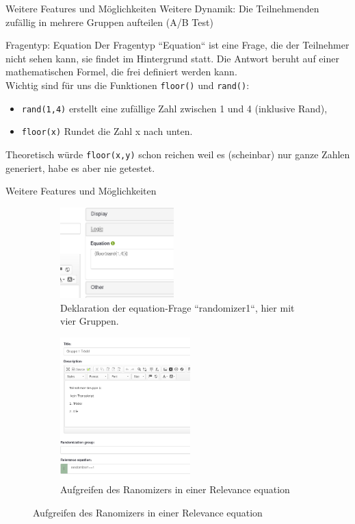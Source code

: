 \documentclass[aspectratio=1610, 9pt]{beamer}
\begin{document}
\begin{frame}
	{Weitere Features und Möglichkeiten}
	Weitere Dynamik: Die Teilnehmenden zufällig in mehrere Gruppen aufteilen
	(\alert{A/B Test})
	\\ \medskip
	\begin{block}{Fragentyp: Equation}
		Der Fragentyp ``Equation`` ist eine Frage, die der \alert{Teilnehmer nicht 
		sehen kann}, sie findet im Hintergrund statt. Die Antwort beruht auf einer
		mathematischen Formel, die frei definiert werden kann.
		\\
		Wichtig sind für uns die Funktionen \texttt{floor()} und \texttt{rand()}:
		\begin{itemize}
			\item \texttt{rand(1,4)} erstellt eine zufällige Zahl zwischen 1
				und 4 (inklusive Rand),
			\item \texttt{floor(x)} Rundet die Zahl x nach unten.
		\end{itemize}
		Theoretisch würde \texttt{floor(x,y)} schon reichen weil es
		(\alert{scheinbar}) nur ganze Zahlen generiert, habe es aber nie getestet.
	\end{block}
\end{frame}

\begin{frame}
	{Weitere Features und Möglichkeiten}
	\begin{figure}
		\centering
		\begin{subfigure}[b]{0.2\textwidth}
			\centering
			\includegraphics[height=3.5cm]{images/randomizer-equation.png}
			\caption{Deklaration der equation-Frage ``randomizer1``, hier mit
			vier Gruppen.}
		\end{subfigure}
		\begin{subfigure}[b]{0.7\textwidth}
			\centering
			\includegraphics[height=5.5cm]{images/groupe-relevance.png}
			\caption{Aufgreifen des Ranomizers in einer Relevance equation}
		\end{subfigure}
	\end{figure}
\end{frame}
\end{document}
